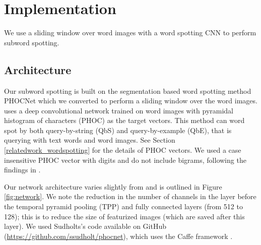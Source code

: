 \documentclass[ms,electronic,twosidetoc,letterpaper,chaptercenter,parttop,lol,lof,lot]{byumsphd}
\begin{document}
\section{Implementation}

We use a sliding window over word images with a word spotting CNN to perform subword spotting.

\subsection{Architecture}

Our subword spotting is built on the segmentation based word spotting method PHOCNet \cite{sudholt2016, sudholt2017} which we converted to perform a sliding window over the word images. \cite{sudholt2017} uses a deep convolutional network trained on word images with pyramidal histogram of characters (PHOC) \cite{Almazan2014} as the target vectors. This method can word spot by both query-by-string (QbS) and query-by-example (QbE), that is querying with text words and word images. See Section \ref{relatedwork_wordspotting} for the details of PHOC vectors. We used a case insensitive PHOC vector with digits and do not include bigrams, following the findings in \cite{sudholt2017}. %



Our network architecture varies slightly from \cite{sudholt2017} and is outlined in Figure \ref{fig:network}. We note the reduction in the number of channels in the layer before the temporal pyramid pooling (TPP) and fully connected layers (from 512 to 128); this is to reduce the size of featurized images (which are saved after this layer).  We used Sudholts's code available on GitHub (\url{https://github.com/ssudholt/phocnet}), which uses the Caffe framework \cite{caffe}.

\end{document}
